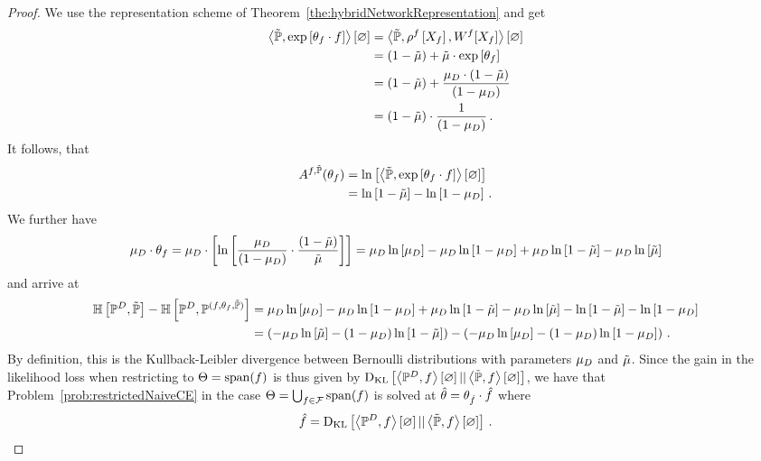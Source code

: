 \begin{proof}
	We use the representation scheme of Theorem~\ref{the:hybridNetworkRepresentation} and get
	\begin{align*}
		\left\langle \tilde{\mathbb{P}}, \mathrm{exp}\left[\theta_{f} \cdot f\right]\right\rangle \left[ \varnothing \right]
		& = \left\langle \tilde{\mathbb{P}}, \rho^{f}\left[X_{f}\right], W^{f}[X_{f}]\right\rangle \left[ \varnothing \right] \\
		& = (1-\tilde{\mu}) + \tilde{\mu}\cdot \mathrm{exp}\left[\theta_{f}\right] \\
		& = (1 - \tilde{\mu}) + \frac{\mu_{D} \cdot (1-\tilde{\mu})}{(1-\mu_{D})} \\
		& = (1-\tilde{\mu}) \cdot \frac{1}{(1-\mu_{D})} \, . 
	\end{align*}
	It follows, that
	\begin{align*}
		A^{f,\tilde{\mathbb{P}}}(\theta_{f}) 
		& = \ln \left[ \left\langle \tilde{\mathbb{P}}, \mathrm{exp}\left[\theta_{f} \cdot f\right]\right\rangle \left[ \varnothing \right] \right] \\
		& = \ln \left[ 1-\tilde{\mu} \right] - \ln \left[ 1-\mu_{D} \right] \, . 
	\end{align*}
	We further have
	\begin{align*}
		\mu_{D} \cdot \theta_{f}
		= \mu_{D} \cdot \left[ \ln \left[ \frac{\mu_{D}}{(1-\mu_{D})}\cdot \frac{(1-\tilde{\mu})}{\tilde{\mu}} \right]  \right]	
		= \mu_{D} \ln \left[ \mu_{D} \right] - \mu_{D} \ln \left[ 1-\mu_{D} \right] + \mu_{D} \ln \left[ 1-\tilde{\mu} \right] - \mu_{D} \ln \left[ \tilde{\mu} \right]
	\end{align*}
	and arrive at
	\begin{align*}
		\mathbb{H}\left[\mathbb{P}^{D},\tilde{\mathbb{P}}\right]
		- \mathbb{H}\left[\mathbb{P}^{D},\mathbb{P}^{(f,\theta_{f},\tilde{\mathbb{P}})}\right]
		& =  \mu_{D} \ln \left[ \mu_{D} \right] - \mu_{D} \ln \left[ 1-\mu_{D} \right] + \mu_{D} \ln \left[ 1-\tilde{\mu} \right] - \mu_{D} \ln \left[ \tilde{\mu} \right]
		-  \ln \left[ 1-\tilde{\mu} \right] - \ln \left[ 1-\mu_{D} \right] \\
		& = \left( -\mu_{D} \ln \left[ \tilde{\mu} \right] - (1-\mu_{D}) \ln \left[ 1-\tilde{\mu} \right] \right)  - \left( -\mu_{D} \ln \left[ \mu_{D} \right] - (1-\mu_{D}) \ln \left[ 1-\mu_{D} \right] \right) \, . 
	\end{align*}
	By definition, this is the Kullback-Leibler divergence between Bernoulli distributions with parameters $\mu_{D}$ and $\tilde{\mu}$.
	Since the gain in the likelihood loss when restricting to $\Theta = \mathrm{span}(f)$ is thus given by $\mathrm{D}_{\mathrm{KL}}\left[ \left\langle \mathbb{P}^{D},f\right\rangle \left[ \varnothing \right] || \left\langle \tilde{\mathbb{P}},f\right\rangle \left[ \varnothing \right] \right]$, we have that Problem~\ref{prob:restrictedNaiveCE}  in the case $\Theta = \bigcup_{f\in\mathcal{F}}\mathrm{span}(f)$ is solved at $\hat{\theta} = \theta_{\hat{f}}\cdot \hat{f}$ where
		\[ \hat{f} = \mathrm{D}_{\mathrm{KL}}\left[ \left\langle \mathbb{P}^{D},f\right\rangle \left[ \varnothing \right] || \left\langle \tilde{\mathbb{P}},f\right\rangle \left[ \varnothing \right] \right] \, . \]
\end{proof}

